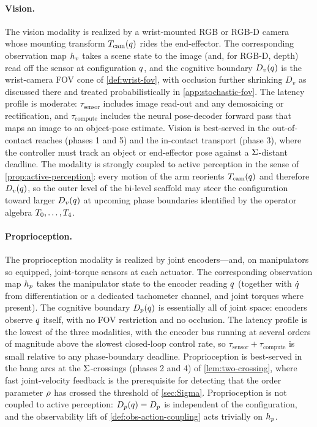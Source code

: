 \paragraph{Vision.}
The vision modality is realized by a wrist-mounted RGB or RGB-D
camera whose mounting transform $T_{\mathrm{cam}}(q)$
rides the end-effector. The corresponding observation map
$h_{v}$ takes a scene state to the image (and, for RGB-D,
depth) read off the sensor at configuration $q$, and the
cognitive boundary $D_{v}(q)$ is the wrist-camera FOV
cone of \cref{def:wrist-fov}, with occlusion further shrinking
$D_{v}$ as discussed there and treated probabilistically in
\cref{app:stochastic-fov}. The latency profile is moderate:
$\tau_{\mathrm{sensor}}$ includes image read-out and any
demosaicing or rectification, and $\tau_{\mathrm{compute}}$
includes the neural pose-decoder forward pass that maps an image
to an object-pose estimate. Vision is best-served in the
out-of-contact reaches (phases 1 and 5) and the in-contact
transport (phase 3), where the controller must track an object
or end-effector pose against a $\Sigma$-distant deadline. The
modality is strongly coupled to active perception in the sense of
\cref{prop:active-perception}: every motion of the arm reorients
$T_{\mathrm{cam}}(q)$ and therefore $D_{v}(q)$,
so the outer level of the bi-level scaffold may steer the
configuration toward larger $D_{v}(q)$ at upcoming phase
boundaries identified by the operator algebra
$T_{0}, \ldots, T_{4}$.

\paragraph{Proprioception.}
The proprioception modality is realized by joint encoders---and,
on manipulators so equipped, joint-torque sensors at each
actuator. The corresponding observation map $h_{p}$ takes
the manipulator state to the encoder reading $q$
(together with $\dot{q}$ from differentiation or a
dedicated tachometer channel, and joint torques where present).
The cognitive boundary $D_{p}(q)$ is essentially all of
joint space: encoders observe $q$ itself, with no FOV
restriction and no occlusion. The latency profile is the lowest
of the three modalities, with the encoder bus running at
several orders of magnitude above the slowest closed-loop control
rate, so $\tau_{\mathrm{sensor}} + \tau_{\mathrm{compute}}$ is
small relative to any phase-boundary deadline. Proprioception is
best-served in the bang arcs at the $\Sigma$-crossings (phases 2
and 4) of \cref{lem:two-crossing}, where fast joint-velocity
feedback is the prerequisite for detecting that the order
parameter $\rho$ has crossed the threshold of
\cref{sec:Sigma}. Proprioception is not coupled to active
perception: $D_{p}(q) = D_{p}$ is independent of the
configuration, and the observability lift of
\cref{def:obs-action-coupling} acts trivially on $h_{p}$.


